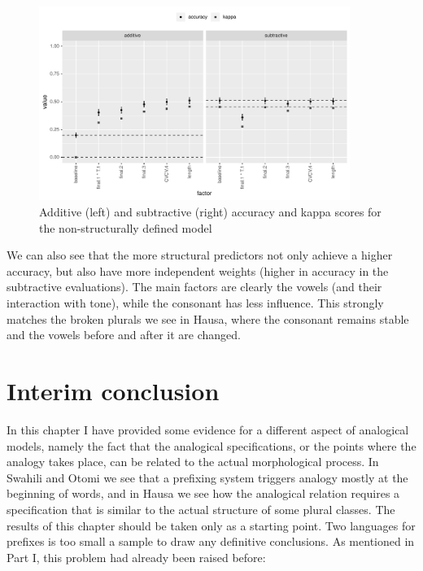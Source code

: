 \begin{figure}
    \centering
    \includegraphics[width=0.9\textwidth]{./figures/hausa/nostruc-overall.pdf}
    \caption{Additive (left) and subtractive (right) accuracy and kappa scores for the non-structurally defined model}\label{fig:nostruc-overall}
\end{figure}

\largerpage
We can also see that the more structural predictors not only achieve a higher accuracy, but also have more independent weights (higher in accuracy in the subtractive evaluations). The main factors are clearly the vowels (and their interaction with tone), while the consonant has less influence. This strongly matches the broken  plurals we see in Hausa, where the consonant remains stable and the vowels before and after it are changed.


\section{Interim conclusion}

In this chapter I have provided some evidence for a different aspect of analogical models, namely the fact that the analogical specifications, or the points where the analogy takes place, can be related to the actual morphological process. In Swahili and Otomi we see that a prefixing system triggers analogy mostly at the beginning of words, and in Hausa we see how the analogical relation requires a specification that is similar to the actual structure of some plural classes. The results of this chapter should be taken only as a starting point. Two languages for prefixes is too small a sample to draw any definitive conclusions. As mentioned in Part I, this problem had already been raised before:


